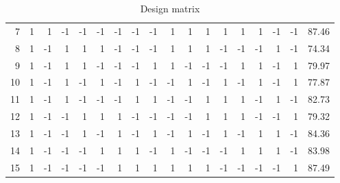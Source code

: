 \documentclass{article}
\begin{document}
\begin{table}[!ht]
{\begin{tabular}{|r|r|r|r|r|r|r|r|r|r|r|r|r|r|r|r|r|r|}
            7         & 1                  & 1          & -1         & -1         & -1         & -1          & -1          & -1          & 1           & 1           & 1           & 1            & 1            & 1            & -1           & -1            & 87.46      \\
            8         & 1                  & -1         & 1          & 1          & 1          & -1          & -1          & -1          & 1           & 1           & 1           & -1           & -1           & -1           & 1            & -1            & 74.34      \\
            9         & 1                  & -1         & 1          & 1          & -1         & -1          & -1          & 1           & 1           & -1          & -1          & -1           & 1            & 1            & -1           & 1             & 79.97      \\
            10        & 1                  & -1         & 1          & -1         & 1          & -1          & 1           & -1          & -1          & 1           & -1          & 1            & -1           & 1            & -1           & 1             & 77.87      \\
            11        & 1                  & -1         & 1          & -1         & -1         & -1          & 1           & 1           & -1          & -1          & 1           & 1            & 1            & -1           & 1            & -1            & 82.73      \\
            12        & 1                  & -1         & -1         & 1          & 1          & 1           & -1          & -1          & -1          & -1          & 1           & 1            & 1            & -1           & -1           & 1             & 79.32      \\
            13        & 1                  & -1         & -1         & 1          & -1         & 1           & -1          & 1           & -1          & 1           & -1          & 1            & -1           & 1            & 1            & -1            & 84.36      \\
            14        & 1                  & -1         & -1         & -1         & 1          & 1           & 1           & -1          & 1           & -1          & -1          & -1           & 1            & 1            & 1            & -1            & 83.98      \\
            15        & 1                  & -1         & -1         & -1         & -1         & 1           & 1           & 1           & 1           & 1           & 1           & -1           & -1           & -1           & -1           & 1             & 87.49      \\
        \end{tabular}
    }
    \caption{Design matrix}
    \label{tab:design_matrix}
\end{table}
\end{document}
